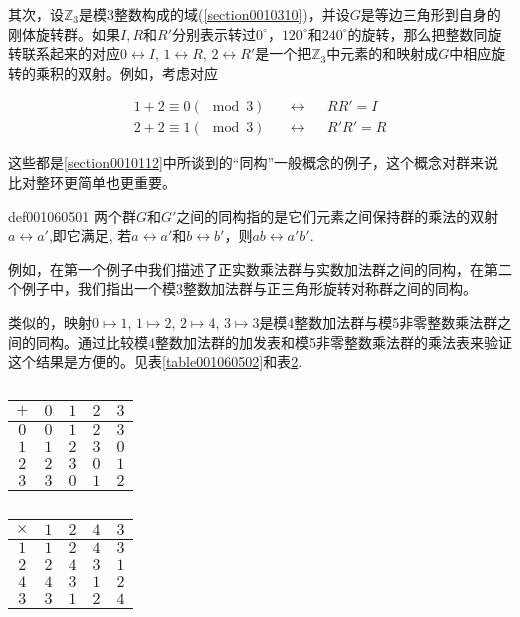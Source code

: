 其次，设$\mathbb{Z}_3$是模3整数构成的域(\ref{section0010310})，并设$G$是等边三角形到自身的刚体旋转群。如果$I, R$和$R'$分别表示转过$0^{\circ}$，$120^{\circ}$和$240^{\circ}$的旋转，那么把整数同旋转联系起来的对应$0 \leftrightarrow I$, $1 \leftrightarrow R$, $2 \leftrightarrow R'$是一个把$\mathbb{Z}_3$中元素的和映射成$G$中相应旋转的乘积的双射。例如，考虑对应

\begin{equation*}
\begin{aligned}
1 + 2 \equiv 0 (\mod{3})\quad &\leftrightarrow &&RR' = I\\
2 + 2 \equiv 1 (\mod{3})\quad &\leftrightarrow &&R'R' = R
\end{aligned}
\end{equation*}

这些都是\ref{section0010112}中所谈到的“同构”一般概念的例子，这个概念对群来说比对整环更简单也更重要。
\begin{definition}{}{def001060501}
两个群$G$和$G'$之间的同构指的是它们元素之间保持群的乘法的双射$a \leftrightarrow a'$,即它满足, 若$a \leftrightarrow a'$和$b \leftrightarrow b'$，则$ab \leftrightarrow a'b'$.
\end{definition}

例如，在第一个例子中我们描述了正实数乘法群与实数加法群之间的同构，在第二个例子中，我们指出一个模3整数加法群与正三角形旋转对称群之间的同构。

类似的，映射$0 \mapsto 1$, $1 \mapsto 2$, $2 \mapsto 4$, $3 \mapsto 3$是模4整数加法群与模5非零整数乘法群之间的同构。通过比较模4整数加法群的加发表和模5非零整数乘法群的乘法表来验证这个结果是方便的。见表\ref{table001060502}和表\ref{table001060503}.
\begin{table}[htbp]
\begin{minipage}{0.45\textwidth}
\centering
\caption{}\label{table001060502}
\begin{tabular}{c|cccc}
$+$ & $0$ & $1$ & $2$ & $3$ \\ \hline
$0$ & $0$ & $1$ & $2$ & $3$ \\
$1$ & $1$ & $2$ & $3$ & $0$ \\
$2$ & $2$ & $3$ & $0$ & $1$ \\
$3$ & $3$ & $0$ & $1$ & $2$ 
\end{tabular}
\end{minipage}
\begin{minipage}{0.45\textwidth}
\centering
\caption{}\label{table001060503}
\begin{tabular}{c|cccc}
$\times$ & $1$ & $2$ & $4$ & $3$ \\ \hline
$1$ & $1$ & $2$ & $4$ & $3$ \\
$2$ & $2$ & $4$ & $3$ & $1$ \\
$4$ & $4$ & $3$ & $1$ & $2$ \\
$3$ & $3$ & $1$ & $2$ & $4$ 
\end{tabular}
\end{minipage}
\end{table}

